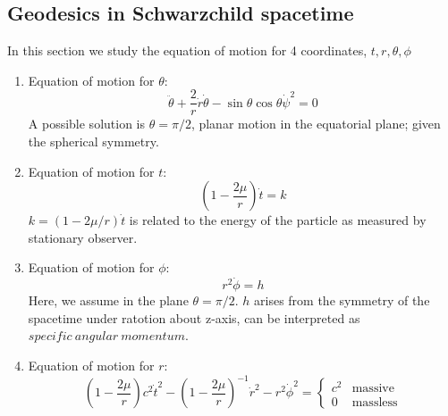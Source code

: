 \documentclass[12pt,a4paper]{article}
\begin{document}
\subsection{Geodesics in Schwarzchild spacetime}
In this section we study the equation of motion for 4 coordinates, $t,r,\theta,\phi$
    \begin{enumerate}
        \item Equation of motion for $\theta$:
        \begin{equation}
            \ddot{\theta}+\frac{2}{r}\dot{r}\dot{\theta} - \sin{\theta}\cos{\theta}\dot{\psi}^2 = 0
        \end{equation}
        A possible solution is $\theta = \pi/2$, planar motion in the equatorial plane; given the spherical symmetry.
        \item Equation of motion for $t$:
        \begin{equation}
            (1-\frac{2\mu}{r})\dot{t} = k
        \end{equation}
        $k = (1-2\mu/r)\dot {t}$ is related to the energy of the particle as measured by stationary observer.
        \item Equation of motion for $\phi$:
        \begin{equation}
            r^2\dot{\phi} = h
        \end{equation}
        Here, we assume in the plane $\theta= \pi/2$. $h$ arises from the symmetry of the spacetime under ratotion about z-axis, can be interpreted as $specific \ angular\ momentum$.
        \item Equation of motion for $r$:\\
        \begin{equation}
            (1-\frac{2\mu}{r})c^2\dot{t}^2 - (1-\frac{2\mu}{r})^{-1} \dot{r}^2 - r^2\dot{\phi}^2 =
            \begin{cases}
                c^2 & \text{massive}\\
                0 & \text{massless}
            \end{cases}
        \end{equation}
    \end{enumerate}
\end{document}
